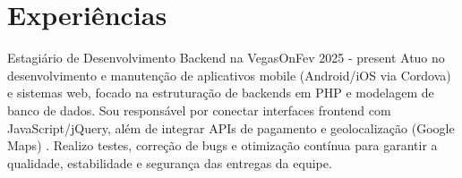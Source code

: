 \documentclass[a4paper,12pt]{article}
\begin{document}

\section{Experiências}

\begin{jobshort}{Estagiário de Desenvolvimento Backend na VegasOn}{Fev 2025 - present}
Atuo no desenvolvimento e manutenção de aplicativos mobile (Android/iOS via Cordova) e sistemas web, focado na estruturação de backends em PHP e modelagem de banco de dados. Sou responsável por conectar interfaces frontend com JavaScript/jQuery, além de integrar APIs de pagamento e geolocalização (Google Maps) . Realizo testes, correção de bugs e otimização contínua para garantir a qualidade, estabilidade e segurança das entregas da equipe.
\end{jobshort}

\end{document}
